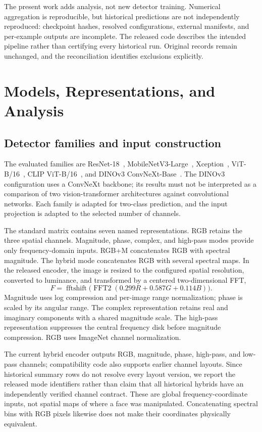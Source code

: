 \documentclass[conference,10pt,letterpaper]{IEEEtran}
\begin{document}
The present work adds analysis, not new detector training. Numerical aggregation is reproducible, but historical predictions are not independently reproduced: checkpoint hashes, resolved configurations, external manifests, and per-example outputs are incomplete. The released code describes the intended pipeline rather than certifying every historical run. Original records remain unchanged, and the reconciliation identifies exclusions explicitly.

\section{Models, Representations, and Analysis}
\subsection{Detector families and input construction}
The evaluated families are ResNet-18~\cite{he2016}, MobileNetV3-Large~\cite{howard2019}, Xception~\cite{chollet2017}, ViT-B/16~\cite{dosovitskiy2021}, CLIP ViT-B/16~\cite{radford2021}, and DINOv3 ConvNeXt-Base~\cite{simeoni2025}. The DINOv3 configuration uses a ConvNeXt backbone; its results must not be interpreted as a comparison of two vision-transformer architectures against convolutional networks. Each family is adapted for two-class prediction, and the input projection is adapted to the selected number of channels.

The standard matrix contains seven named representations. RGB retains the three spatial channels. Magnitude, phase, complex, and high-pass modes provide only frequency-domain inputs. RGB+M concatenates RGB with spectral magnitude. The hybrid mode concatenates RGB with several spectral maps. In the released encoder, the image is resized to the configured spatial resolution, converted to luminance, and transformed by a centered two-dimensional FFT,
\begin{equation}
F=\operatorname{fftshift}\bigl(\operatorname{FFT2}(0.299R+0.587G+0.114B)\bigr).
\end{equation}
Magnitude uses log compression and per-image range normalization; phase is scaled by its angular range. The complex representation retains real and imaginary components with a shared magnitude scale. The high-pass representation suppresses the central frequency disk before magnitude compression. RGB uses ImageNet channel normalization.

The current hybrid encoder outputs RGB, magnitude, phase, high-pass, and low-pass channels; compatibility code also supports earlier channel layouts. Since historical summary rows do not resolve every layout version, we report the released mode identifiers rather than claim that all historical hybrids have an independently verified channel contract. These are global frequency-coordinate inputs, not spatial maps of where a face was manipulated. Concatenating spectral bins with RGB pixels likewise does not make their coordinates physically equivalent.
\end{document}
